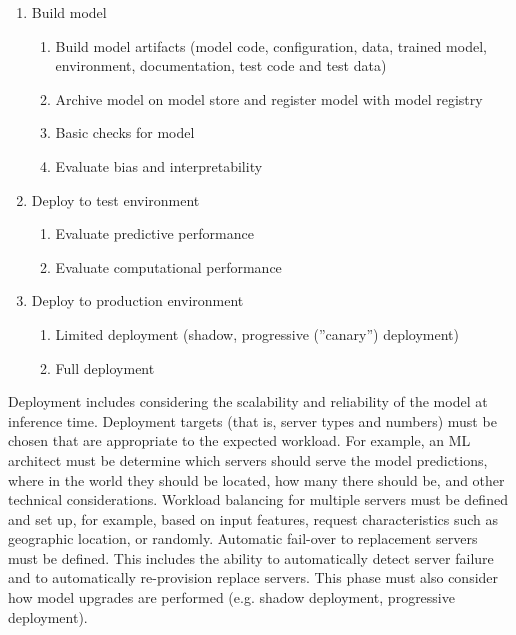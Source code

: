 \begin{samepage}
\begin{enumerate}
\item Build model
\begin{enumerate}
   \item Build model artifacts (model code, configuration, data, trained model, environment, documentation, test code and test data)
   \item Archive model on model store and register model with model registry
   \item Basic checks for model
   \item Evaluate bias and interpretability 
\end{enumerate}
\item Deploy to test environment
\begin{enumerate}
    \item Evaluate predictive performance
    \item Evaluate computational performance
\end{enumerate}
\item Deploy to production environment
\begin{enumerate}
   \item Limited deployment (shadow, progressive (''canary'') deployment)
   \item Full deployment
\end{enumerate}
\end{enumerate} 
\end{samepage}

Deployment includes considering the scalability and reliability of the model at  inference time. Deployment targets (that is, server types and numbers) must be chosen that are appropriate to the expected workload. For example, an ML architect must be determine which servers should serve the model predictions, where in the world they should be located, how many there should be, and other technical considerations. Workload balancing for multiple servers must be defined and set up, for example, based on input features, request characteristics such as geographic location, or randomly. Automatic fail-over to replacement servers must be defined. This includes the ability to automatically detect server failure and to automatically re-provision replace servers. This phase must also consider how model upgrades are performed (e.g. shadow deployment, progressive deployment).

